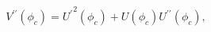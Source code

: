 \begin{equation}
\label{E14}
V^{\prime\prime}(\phi_c) = {U^\prime}^2 (\phi_c) +
U(\phi_c)U^{\prime \prime}(\phi_c),
\end{equation}

